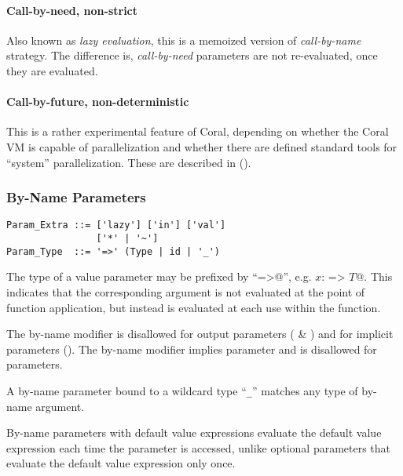 \paragraph{Call-by-need, non-strict}
Also known as {\em lazy evaluation}, this is a memoized version of {\em call-by-name} strategy. The difference is, {\em call-by-need} parameters are not re-evaluated, once they are evaluated. 

\paragraph{Call-by-future, non-deterministic}
This is a rather experimental feature of Coral, depending on whether the Coral VM is capable of parallelization and whether there are defined standard tools for ``system'' parallelization. These are described in ().






\subsubsection{By-Name Parameters}
\label{sec:by-name-parameters}

\syntax\begin{lstlisting}
Param_Extra ::= ['lazy'] ['in'] ['val']
                ['*' | '~']
Param_Type  ::= '=>' (Type | id | '_')
\end{lstlisting}

The type of a value parameter may be prefixed by ``\lstinline@=>@'', e.g. \lstinline@$x$: => $T$@. This indicates that the corresponding argument is not evaluated at the point of function application, but instead is evaluated at each use within the function.

The by-name modifier is disallowed for output parameters ( \& ) and for implicit parameters (). The by-name modifier implies  parameter and is disallowed for  parameters. 

A by-name parameter bound to a wildcard type ``\lstinline!_!'' matches any type of by-name argument. 

By-name parameters with default value expressions evaluate the default value expression each time the parameter is accessed, unlike optional parameters that evaluate the default value expression only once. 






